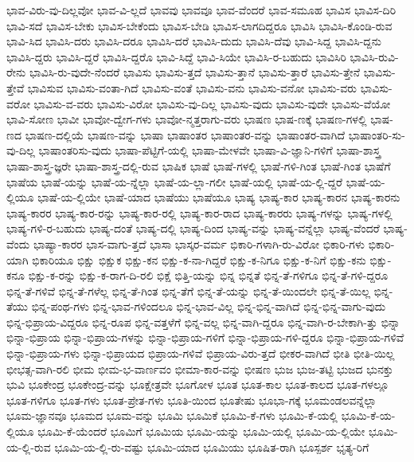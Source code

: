 {ಭಾವ-ವಿರು-ವು-ದಿಲ್ಲವೋ
ಭಾವ-ವಿ-ಲ್ಲದೆ
ಭಾವವು
ಭಾವವೂ
ಭಾವ-ವೆಂದರೆ
ಭಾವ-ಸಮೂಹ
ಭಾವಿಸ
ಭಾವಿಸ-ದಿರಿ
ಭಾವಿ-ಸದೆ
ಭಾವಿಸ-ಬೇಕು
ಭಾವಿಸ-ಬೇಕೆಂದು
ಭಾವಿಸ-ಬೇಡಿ
ಭಾವಿಸ-ಲಾಗದಿದ್ದರೂ
ಭಾವಿಸಿ
ಭಾವಿಸಿ-ಕೊಂಡಿ-ರುವ
ಭಾವಿ-ಸಿದ
ಭಾವಿಸಿ-ದರು
ಭಾವಿಸಿ-ದರೂ
ಭಾವಿಸಿ-ದರೆ
ಭಾವಿಸಿ-ದುದು
ಭಾವಿಸಿ-ದೆವು
ಭಾವಿ-ಸಿದ್ದ
ಭಾವಿಸಿ-ದ್ದನು
ಭಾವಿಸಿ-ದ್ದರು
ಭಾವಿಸಿ-ದ್ದರೆ
ಭಾವಿಸಿ-ದ್ದರೊ
ಭಾವಿ-ಸಿದ್ದೆ
ಭಾವಿ-ಸಿಯೇ
ಭಾವಿಸಿ-ರ-ಬಹುದು
ಭಾವಿಸಿರಿ
ಭಾವಿಸಿ-ರುವಿ-ರೇನು
ಭಾವಿಸಿ-ರು-ವುದೇ-ನೆಂದರೆ
ಭಾವಿಸು
ಭಾವಿಸು-ತ್ತದೆ
ಭಾವಿಸು-ತ್ತಾನೆ
ಭಾವಿಸು-ತ್ತಾರೆ
ಭಾವಿಸು-ತ್ತೇನೆ
ಭಾವಿಸು-ತ್ತೇವೆ
ಭಾವಿಸುವ
ಭಾವಿಸು-ವಂತಾ-ಗಿದೆ
ಭಾವಿಸು-ವಂತೆ
ಭಾವಿಸು-ವನು
ಭಾವಿಸು-ವನೋ
ಭಾವಿಸು-ವರು
ಭಾವಿಸು-ವರೋ
ಭಾವಿಸು-ವ-ವರು
ಭಾವಿಸು-ವಿರೋ
ಭಾವಿಸು-ವು-ದಿಲ್ಲ
ಭಾವಿಸು-ವುದು
ಭಾವಿಸು-ವುದೇ
ಭಾವಿಸು-ವೆಯೋ
ಭಾವಿ-ಸೋಣ
ಭಾವೀ
ಭಾವೋ-ದ್ವೇಗ-ಗಳು
ಭಾವೋ-ನ್ಮತ್ತರಾಗು-ವರು
ಭಾಷಣ
ಭಾಷ-ಣಕ್ಕೆ
ಭಾಷಣ-ಗಳಲ್ಲಿ
ಭಾಷ-ಣದ
ಭಾಷಣ-ದಲ್ಲಿಯೆ
ಭಾಷಣ-ವನ್ನು
ಭಾಷಾ
ಭಾಷಾಂತರ
ಭಾಷಾಂತರ-ವನ್ನು
ಭಾಷಾಂತರ-ವಾಗಿದೆ
ಭಾಷಾಂತರಿ-ಸು-ವು-ದಿಲ್ಲ
ಭಾಷಾಂತರಿಸು-ವುದು
ಭಾಷಾ-ಪೆಟ್ಟಿಗೆ-ಯಲ್ಲಿ
ಭಾಷಾ-ಮೇಳವೇ
ಭಾಷಾ-ವಿ-ಜ್ಞಾನಿ-ಗಳಿಗೆ
ಭಾಷಾ-ಶಾಸ್ತ್ರ
ಭಾಷಾ-ಶಾಸ್ತ್ರ-ಜ್ಞರೇ
ಭಾಷಾ-ಶಾಸ್ತ್ರ-ದಲ್ಲಿ-ರುವ
ಭಾಷಿಕ
ಭಾಷೆ
ಭಾಷೆ-ಗಳಲ್ಲಿ
ಭಾಷೆ-ಗಳಿ-ಗಿಂತ
ಭಾಷೆ-ಗಿಂತ
ಭಾಷೆಗೆ
ಭಾಷೆಯ
ಭಾಷೆ-ಯನ್ನು
ಭಾಷೆ-ಯ-ನ್ನೆಲ್ಲಾ
ಭಾಷೆ-ಯ-ಲ್ಲಾ-ಗಲೀ
ಭಾಷೆ-ಯಲ್ಲಿ
ಭಾಷೆ-ಯ-ಲ್ಲಿ-ದ್ದರೆ
ಭಾಷೆ-ಯ-ಲ್ಲಿಯೂ
ಭಾಷೆ-ಯ-ಲ್ಲಿಯೇ
ಭಾಷೆ-ಯಾದ
ಭಾಷೆಯು
ಭಾಷೆಯೂ
ಭಾಷ್ಯ
ಭಾಷ್ಯ-ಕಾರ
ಭಾಷ್ಯ-ಕಾರನ
ಭಾಷ್ಯ-ಕಾರನು
ಭಾಷ್ಯ-ಕಾರರ
ಭಾಷ್ಯ-ಕಾರ-ರನ್ನು
ಭಾಷ್ಯ-ಕಾರ-ರಲ್ಲಿ
ಭಾಷ್ಯ-ಕಾರ-ರಾದ
ಭಾಷ್ಯ-ಕಾರರು
ಭಾಷ್ಯ-ಗಳನ್ನು
ಭಾಷ್ಯ-ಗಳಲ್ಲಿ
ಭಾಷ್ಯ-ಗಳಿ-ರ-ಬಹುದು
ಭಾಷ್ಯ-ದಂತೆ
ಭಾಷ್ಯ-ದಲ್ಲಿ
ಭಾಷ್ಯ-ದಿಂದ
ಭಾಷ್ಯ-ವನ್ನು
ಭಾಷ್ಯ-ವನ್ನೆಲ್ಲಾ
ಭಾಷ್ಯ-ವೆಂದರೆ
ಭಾಷ್ಯ-ವೆಂದು
ಭಾಷ್ಯಾ-ಕಾರರ
ಭಾಸ-ವಾಗು-ತ್ತದೆ
ಭಾಸಾ
ಭಾಸ್ಕರ-ವರ್ಮ
ಭಿಕಾರಿ-ಗಳಾಗಿ-ರು-ವಿರೋ
ಭಿಕಾರಿ-ಗಳು
ಭಿಕಾರಿ-ಯಾಗಿ
ಭಿಕಾರಿಯೂ
ಭಿಕ್ಷು
ಭಿಕ್ಷುಕ
ಭಿಕ್ಷು-ಕನ
ಭಿಕ್ಷು-ಕ-ನಾ-ಗಿದ್ದರೆ
ಭಿಕ್ಷು-ಕ-ನಿಗೂ
ಭಿಕ್ಷು-ಕ-ನಿಗೆ
ಭಿಕ್ಷು-ಕನು
ಭಿಕ್ಷು-ಕನೂ
ಭಿಕ್ಷು-ಕ-ರನ್ನು
ಭಿಕ್ಷು-ಕ-ರಾಗ-ದಿ-ರಲಿ
ಭಿಕ್ಷೆ
ಭಿತ್ತಿ-ಯನ್ನು
ಭಿನ್ನ
ಭಿನ್ನತೆ
ಭಿನ್ನ-ತೆ-ಗಳಿಗೂ
ಭಿನ್ನ-ತೆ-ಗಳಿ-ದ್ದರೂ
ಭಿನ್ನ-ತೆ-ಗಳಿವೆ
ಭಿನ್ನ-ತೆ-ಗಳೆಲ್ಲ
ಭಿನ್ನ-ತೆ-ಗಿಂತ
ಭಿನ್ನ-ತೆಗೆ
ಭಿನ್ನ-ತೆ-ಯನ್ನು
ಭಿನ್ನ-ತೆ-ಯಿಂದಲೇ
ಭಿನ್ನ-ತೆ-ಯಿಲ್ಲ
ಭಿನ್ನ-ತೆಯು
ಭಿನ್ನ-ಪಂಥ-ಗಳು
ಭಿನ್ನ-ಭಾವ-ಗಳಿಂದಲೂ
ಭಿನ್ನ-ಭಾವ-ವಿಲ್ಲ
ಭಿನ್ನ-ಭಿನ್ನ-ವಾಗಿದೆ
ಭಿನ್ನ-ಭಿನ್ನ-ವಾಗು-ವುದು
ಭಿನ್ನ-ಭಿಪ್ರಾಯ-ವಿದ್ದರೂ
ಭಿನ್ನ-ರೂಪ
ಭಿನ್ನ-ವತ್ತಳೆಗೆ
ಭಿನ್ನ-ವಲ್ಲ
ಭಿನ್ನ-ವಾಗಿ-ದ್ದರೂ
ಭಿನ್ನ-ವಾಗಿ-ರ-ಬೇಕಾಗಿ-ತ್ತು
ಭಿನ್ನಾ
ಭಿನ್ನಾ-ಭಿಪ್ರಾಯ
ಭಿನ್ನಾ-ಭಿಪ್ರಾಯ-ಗಳನ್ನು
ಭಿನ್ನಾ-ಭಿಪ್ರಾಯ-ಗಳಿಗೆ
ಭಿನ್ನಾ-ಭಿಪ್ರಾಯ-ಗಳಿ-ದ್ದರೂ
ಭಿನ್ನಾ-ಭಿಪ್ರಾಯ-ಗಳಿವೆ
ಭಿನ್ನಾ-ಭಿಪ್ರಾಯ-ಗಳು
ಭಿನ್ನಾ-ಭಿಪ್ರಾಯದ
ಭಿಪ್ರಾಯ-ಗಳಿವೆ
ಭಿಪ್ರಾಯ-ವಿರು-ತ್ತದೆ
ಭೀಕರ-ವಾಗಿದೆ
ಭೀತಿ
ಭೀತಿ-ಯಿಲ್ಲ
ಭೀಭತ್ಸ-ವಾಗಿ-ರಲಿ
ಭೀಮ
ಭೀಮ-ಭ-ವಾರ್ಣವಂ
ಭೀಮಾ-ಕಾರ-ವನ್ನು
ಭೀಷಣ
ಭುಜ
ಭುಜ-ತಟ್ಟಿ
ಭುಜದ
ಭುನಕ್ತು
ಭುವಿ
ಭೂಕೇಂದ್ರ
ಭೂಕೇಂದ್ರ-ವನ್ನು
ಭೂಕ್ಷೇತ್ರವೇ
ಭೂಗೋಳ
ಭೂತ
ಭೂತ-ಕಾಲ
ಭೂತ-ಕಾಲದ
ಭೂತ-ಗಳಲ್ಲೂ
ಭೂತ-ಗಳಿಗೂ
ಭೂತ-ಗಳು
ಭೂತ-ಪ್ರೇತ-ಗಳು
ಭೂತಿ-ಯಿಂದ
ಭೂತೇಷು
ಭೂಭಾ-ಗಕ್ಕೆ
ಭೂಮಂಡಲವನ್ನೆಲ್ಲಾ
ಭೂಮ-ಜ್ಞಾನವೂ
ಭೂಮದ
ಭೂಮ-ವನ್ನು
ಭೂಮಿ
ಭೂಮಿಕೆ
ಭೂಮಿ-ಕೆ-ಗಳು
ಭೂಮಿ-ಕೆ-ಯಲ್ಲಿ
ಭೂಮಿ-ಕೆ-ಯ-ಲ್ಲಿಯೂ
ಭೂಮಿ-ಕೆ-ಯೆಂದರೆ
ಭೂಮಿಗೆ
ಭೂಮಿಯ
ಭೂಮಿ-ಯನ್ನು
ಭೂಮಿ-ಯಲ್ಲಿ
ಭೂಮಿ-ಯ-ಲ್ಲಿಯೇ
ಭೂಮಿ-ಯ-ಲ್ಲಿ-ರುವ
ಭೂಮಿ-ಯ-ಲ್ಲಿ-ರು-ವಷ್ಟು
ಭೂಮಿ-ಯಾದ
ಭೂಮಿಯು
ಭೂಷಿತ-ರಾಗಿ
ಭೂಸ್ಪರ್ಶ
ಭೃತ್ಯ-ರಿಗೆ
}
